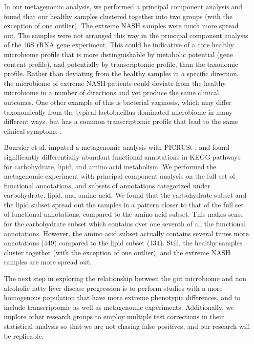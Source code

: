In our metagenomic analysis, we performed a principal component analysis and found that our healthy samples clustered together into two groups (with the exception of one outlier). The extreme NASH samples were much more spread out. The samples were not arranged this way in the principal component analysis of the 16S rRNA gene experiment. This could be indicative of a core healthy microbiome profile that is more distinguishable by metabolic potential (gene content profile), and potentially by transcriptomic profile, than the taxonomic profile. Rather than deviating from the healthy samples in a specific direction, the microbiome of extreme NASH patients could deviate from the healthy microbiome in a number of directions and yet produce the same clinical outcomes. One other example of this is bacterial vaginosis, which may differ taxonomically from the typical lactobacillus-dominated microbiome in many different ways, but has a common transcriptomic profile that lead to the same clinical symptoms \cite{macklaim2013comparative}.

Boursier et al. \cite{boursier2016severity} imputed a metagenomic analysis with PICRUSt \cite{langille2013predictive}, and found significantly differentially abundant functional annotations in KEGG pathways for carbohydrate, lipid, and amino acid metabolism. We performed the metagenomic experiment with principal component analysis on the full set of functional annotations, and subsets of annotations categorized under carbohydrate, lipid, and amino acid. We found that the carbohydrate subset and the lipid subset spread out the samples in a pattern closer to that of the full set of functional annotations, compared to the amino acid subset. This makes sense for the carbohydrate subset which contains over one seventh of all the functional annotations. However, the amino acid subset actually contains several times more annotations (449) compared to the lipid subset (134). Still, the healthy samples cluster together (with the exception of one outlier), and the extreme NASH samples are more spread out.

The next step in exploring the relationship between the gut microbiome and non alcoholic fatty liver disease progression is to perform studies with a more homogenous population that have more extreme phenotypic differences, and to include transcriptomic as well as metagenomic experiments. Additionally, we implore other research groups to employ multiple test corrections in their statistical analysis so that we are not chasing false positives, and our research will be replicable.

